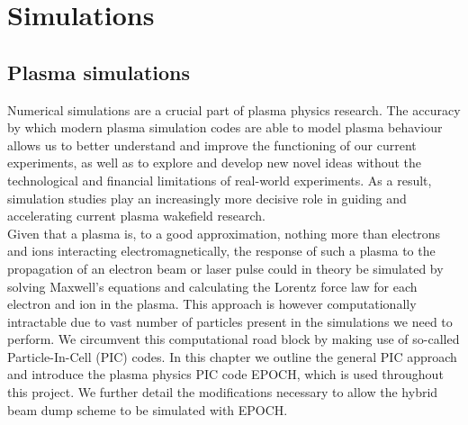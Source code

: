 \chapter{Simulations}
\section{Plasma simulations}
Numerical simulations are a crucial part of plasma physics research. The accuracy by which modern plasma simulation codes are able to model plasma behaviour allows us to better understand and improve the functioning of our current experiments, as well as to explore and develop new novel ideas without the technological and financial limitations of real-world experiments. As a result, simulation studies play an increasingly more decisive role in guiding and accelerating current plasma wakefield research. \\
\indent Given that a plasma is, to a good approximation, nothing more than electrons and ions interacting electromagnetically, the response of such a plasma to the propagation of an electron beam or laser pulse could in theory be simulated by solving Maxwell's equations and calculating the Lorentz force law for each electron and ion in the plasma. This approach is however computationally intractable due to vast number of particles present in the simulations we need to perform. We circumvent this computational road block by making use of so-called Particle-In-Cell (PIC) codes. In this chapter we outline the general PIC approach and introduce the plasma physics PIC code EPOCH, which is used throughout this project. We further detail the modifications necessary to allow the hybrid beam dump scheme to be simulated with EPOCH. 




